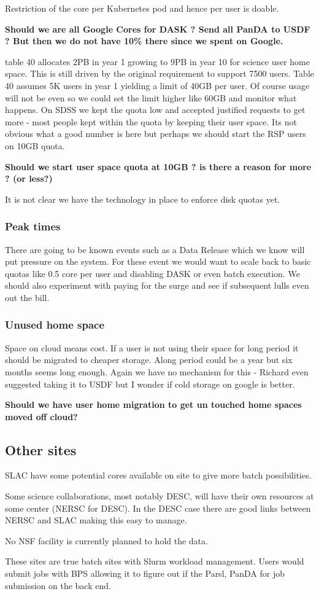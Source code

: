 Restriction of the core per Kubernetes pod and hence per user is doable.


{\bf Should we are all Google Cores for DASK ? Send all PanDA to USDF ? But then we do not have 10\% there since we spent on Google.}

 table 40 allocates 2PB in year 1 growing to 9PB in year 10 for science user home space.
This is still driven by the original requirement to support 7500 users. Table 40 assumes 5K users in year 1
yielding a limit of 40GB per user. Of course usage will not be even so we could set the limit higher like 60GB
and monitor what happens. On SDSS we kept the quota low and accepted justified requests to get more - most people kept within the quota by keeping their user space. Its not obvious what a good number is here but perhaps we should start the RSP users on 10GB quota.


{\bf Should we start user space quota at 10GB ?  is there a reason for more ? (or less?)}

It is not clear we have the technology in place to enforce disk quotas yet.

\subsubsection{Peak times}
There are going to be known events such as a Data Release which we know will put pressure on the system.
For these event we would want to scale back to basic quotas like 0.5 core per user  and disabling DASK or even batch execution.
We should also experiment with paying for the surge and see if subsequent lulls even out the bill.

\subsubsection{Unused home space}
Space on cloud means cost.
If a  user is not using their space for long period it should be migrated to cheaper storage.
Along period could be  a year but six months seems long enough.
Again we have no mechanism for this - Richard even suggested taking it to USDF but I wonder if cold storage on google is better.

{\bf Should we have user home migration to get un touched home spaces moved off cloud?}


\subsection{Other sites}\label{sec:othersites}
SLAC have some potential cores available on site to give more batch possibilities.

Some science collaborations, most notably DESC, will have their own resources at some center (NERSC for DESC).  In the DESC case there are good links between NERSC and SLAC making this easy to manage.

No NSF facility is currently planned to hold the data.

These sites are true batch sites with Slurm workload management. Users would submit jobs with BPS
allowing it to figure out if the Parsl, PanDA for job submission on the back end.


